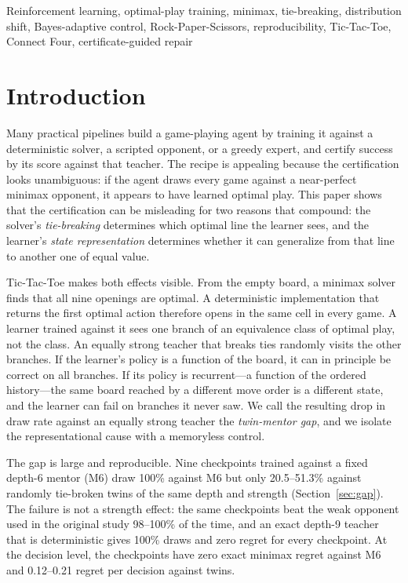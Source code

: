 \documentclass[conference]{IEEEtran}
\begin{document}
\begin{IEEEkeywords}
Reinforcement learning, optimal-play training, minimax, tie-breaking, distribution shift, Bayes-adaptive control, Rock-Paper-Scissors, reproducibility, Tic-Tac-Toe, Connect Four, certificate-guided repair
\end{IEEEkeywords}

\section{Introduction}
\label{sec:intro}

Many practical pipelines build a game-playing agent by training it against a deterministic solver, a scripted opponent, or a greedy expert, and certify success by its score against that teacher. The recipe is appealing because the certification looks unambiguous: if the agent draws every game against a near-perfect minimax opponent, it appears to have learned optimal play. This paper shows that the certification can be misleading for two reasons that compound: the solver's \emph{tie-breaking} determines which optimal line the learner sees, and the learner's \emph{state representation} determines whether it can generalize from that line to another one of equal value.

Tic-Tac-Toe makes both effects visible. From the empty board, a minimax solver finds that all nine openings are optimal. A deterministic implementation that returns the first optimal action therefore opens in the same cell in every game. A learner trained against it sees one branch of an equivalence class of optimal play, not the class. An equally strong teacher that breaks ties randomly visits the other branches. If the learner's policy is a function of the board, it can in principle be correct on all branches. If its policy is recurrent---a function of the ordered history---the same board reached by a different move order is a different state, and the learner can fail on branches it never saw. We call the resulting drop in draw rate against an equally strong teacher the \emph{twin-mentor gap}, and we isolate the representational cause with a memoryless control.

The gap is large and reproducible. Nine checkpoints trained against a fixed depth-6 mentor (M6) draw 100\% against M6 but only 20.5--51.3\% against randomly tie-broken twins of the same depth and strength (Section~\ref{sec:gap}). The failure is not a strength effect: the same checkpoints beat the weak opponent used in the original study 98--100\% of the time, and an exact depth-9 teacher that is deterministic gives 100\% draws and zero regret for every checkpoint. At the decision level, the checkpoints have zero exact minimax regret against M6 and 0.12--0.21 regret per decision against twins.
\end{document}
